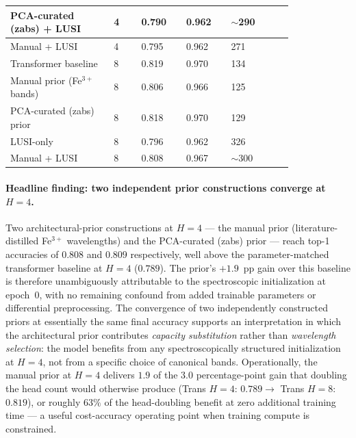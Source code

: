 \documentclass[11pt]{report}
\begin{document}
\begin{table}[!htbp]
\begin{tabular}{p{0.30\linewidth}p{0.08\linewidth}p{0.13\linewidth}p{0.13\linewidth}p{0.18\linewidth}}
\hline
PCA-curated (zabs) + LUSI & 4 & 0.790 & 0.962 & $\sim$290 \\
\hline
Manual + LUSI & 4 & 0.795 & 0.962 & 271 \\
\hline
Transformer baseline & 8 & 0.819 & 0.970 & 134 \\
\hline
Manual prior (Fe$^{3+}$ bands) & 8 & 0.806 & 0.966 & 125 \\
\hline
PCA-curated (zabs) prior & 8 & 0.818 & 0.970 & 129 \\
\hline
LUSI-only & 8 & 0.796 & 0.962 & 326 \\
\hline
Manual + LUSI & 8 & 0.808 & 0.967 & $\sim$300 \\
\hline
\end{tabular}
\end{table}

\paragraph{Headline finding: two independent prior constructions converge at $H=4$.}
Two architectural-prior constructions at $H=4$ --- the manual prior (literature-distilled Fe$^{3+}$ wavelengths) and the PCA-curated (zabs) prior --- reach top-1 accuracies of $0.808$ and $0.809$ respectively, well above the parameter-matched transformer baseline at $H = 4$ ($0.789$). The prior's $+1.9$~pp gain over this baseline is therefore unambiguously attributable to the spectroscopic initialization at epoch~0, with no remaining confound from added trainable parameters or differential preprocessing. The convergence of two independently constructed priors at essentially the same final accuracy supports an interpretation in which the architectural prior contributes \emph{capacity substitution} rather than \emph{wavelength selection}: the model benefits from any spectroscopically structured initialization at $H = 4$, not from a specific choice of canonical bands. Operationally, the manual prior at $H = 4$ delivers $1.9$ of the $3.0$ percentage-point gain that doubling the head count would otherwise produce (Trans $H = 4$: $0.789 \to$ Trans $H = 8$: $0.819$), or roughly $63\%$ of the head-doubling benefit at zero additional training time --- a useful cost-accuracy operating point when training compute is constrained.
\end{document}
